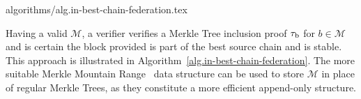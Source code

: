 {algorithms/alg.in-best-chain-federation.tex}

Having a valid $\mathcal{M}$, a verifier verifies a Merkle Tree inclusion proof $\tau_\text{b}$ for $b \in \mathcal{M}$ and is certain the block provided is part of the best source chain and is stable. This approach is illustrated in Algorithm~\ref{alg.in-best-chain-federation}. The more suitable Merkle Mountain Range~\cite{flyclient} data structure can be used to store $\mathcal{M}$ in place of regular Merkle Trees, as they constitute a more efficient append-only structure.